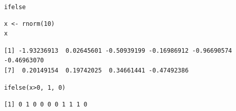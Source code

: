 \documentclass[xcolor={usenames,svgnames,dvipsnames}]{beamer}
\begin{document}
\begin{frame}[fragile,label=sec-4-4-2]{\texttt{ifelse}}
 \lstset{language=R,label= ,caption= ,numbers=none}
\begin{lstlisting}
x <- rnorm(10)
x
\end{lstlisting}

\begin{verbatim}
[1] -1.93236913  0.02645601 -0.50939199 -0.16986912 -0.96690574 -0.46963070
[7]  0.20149154  0.19742025  0.34661441 -0.47492386
\end{verbatim}

\lstset{language=R,label= ,caption= ,numbers=none}
\begin{lstlisting}
ifelse(x>0, 1, 0)
\end{lstlisting}

\begin{verbatim}
[1] 0 1 0 0 0 0 1 1 1 0
\end{verbatim}
\end{frame}
\end{document}
